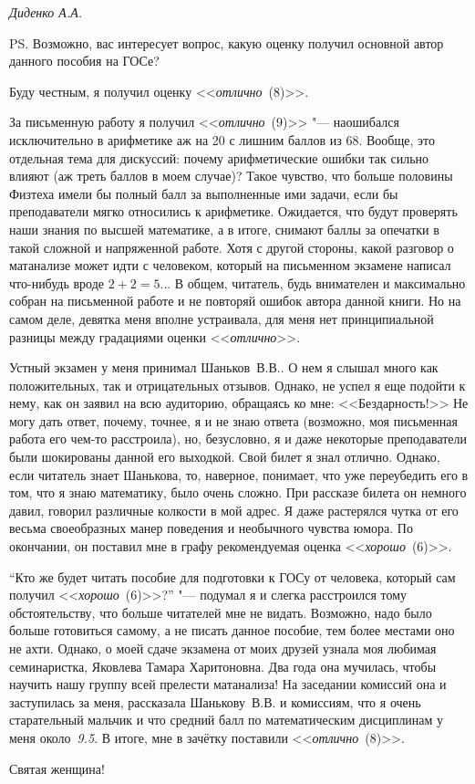 \mbox{}

\noindent\textit{Диденко А.А.}

\mbox{}

PS. Возможно, вас интересует вопрос, какую оценку получил основной автор данного пособия на ГОСе? 

Буду честным, я получил оценку <<\textit{отлично}~(8)>>. 

За письменную работу я получил <<\textit{отлично}~(9)>> "--- наошибался исключительно в арифметике аж на 20 с лишним баллов из 68. Вообще, это отдельная тема для дискуссий: почему арифметические ошибки так сильно влияют (аж треть баллов в моем случае)? Такое чувство, что больше половины Физтеха имели бы полный балл за выполненные ими задачи, если бы преподаватели мягко относились к арифметике. Ожидается, что будут проверять наши знания по высшей математике, а в итоге, снимают баллы за опечатки в такой сложной и напряженной работе. Хотя с другой стороны, какой разговор о матанализе может идти с человеком, который на письменном экзамене написал что-нибудь вроде $2 + 2 = 5$... В общем, читатель, будь внимателен и максимально собран на письменной работе и не повторяй ошибок автора данной книги. Но на самом деле, девятка меня вполне устраивала, для меня нет принципиальной разницы между градациями оценки <<\textit{отлично}>>.

Устный экзамен у меня принимал Шаньков~В.В.. О нем я слышал много как положительных, так и отрицательных отзывов. Однако, не успел я еще подойти к нему, как он заявил на всю аудиторию, обращаясь ко мне: <<Бездарность!>> Не могу дать ответ, почему, точнее, я и не знаю ответа (возможно, моя письменная работа его чем-то расстроила), но, безусловно, я и даже некоторые преподаватели были шокированы данной его выходкой. Свой билет я знал отлично. Однако, если читатель знает Шанькова, то, наверное, понимает, что уже переубедить его в том, что я знаю математику, было очень сложно. При рассказе билета он немного давил, говорил различные колкости в мой адрес. Я даже растерялся чутка от его весьма своеобразных манер поведения и необычного чувства юмора. По окончании, он поставил мне в графу рекомендуемая оценка <<\textit{хорошо}~(6)>>. 

``Кто же будет читать пособие для подготовки к ГОСу от человека, который сам получил <<\textit{хорошо}~(6)>>?'' "--- подумал я и слегка расстроился тому обстоятельству, что больше читателей мне не видать. Возможно, надо было больше готовиться самому, а не писать данное пособие, тем более местами оно не ахти. Однако, о моей сдаче экзамена от моих друзей узнала моя любимая семинаристка, Яковлева Тамара Харитоновна. Два года она мучилась, чтобы научить нашу группу всей прелести матанализа! На заседании комиссий она и заступилась за меня, рассказала Шанькову~В.В. и комиссиям, что я очень старательный мальчик и что средний балл по математическим дисциплинам у меня около~\textit{9.5}. В итоге, мне в зачётку поставили <<\textit{отлично}~(8)>>. 

Святая женщина!